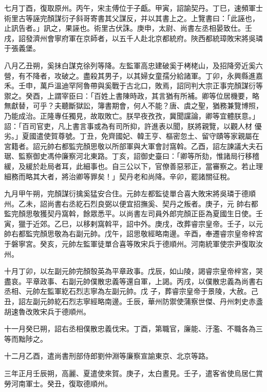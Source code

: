 \begin{pinyinscope}
 七月丁酉，復取原州。丙午，宋主傅位于子甗。甲寅，詔諭契丹。丁巳，速頻軍士術里古等誣完顏謀衍子斜哥寄書其父謀反，并以其書上之。上覽書曰：「此誣也，止訊告者。」訊之，果誣也。術里古伏誅。庚申，太尉、尚書左丞相晏致仕。壬戌，詔發濟州會寧府軍在京師者，以五千人赴北京都統府。陜西都統璋敗宋將吳璘于張義堡。



 八月乙丑朔，奚抹白謀克徐列等降。左監軍高忠建破奚于栲栳山，及招降旁近奚六營，有不降者，攻破之。盡殺其男子，以其婦女童孺分給諸軍。丁卯，永興縣進嘉禾。壬申，萬戶溫迪罕阿魯帶與奚戰于古北口，敗焉，詔同判大宗正事完顏謀衍等禦之。癸酉，上謂宰臣曰：「百姓上書陳時政，其言猶有所補。卿等位居機要，略無獻替，可乎？夫聽斷獄訟，簿書期會，何人不能？唐、虞之聖，猶務兼覽博照，乃能成治。正隆專任獨見，故取敗亡。朕早夜孜孜，冀聞讜論，卿等宜體朕意。」詔：「百司官吏，凡上書言事或為有司所抑，許進表以聞，朕將親覽，以觀人材
 優劣。」夏國遣使賀尊號。丁丑，免齊國妃、韓王亨、樞密忽土、留守賾等家親屬在宮籍者。詔元帥右都監完顏思敬以所部軍與大軍會討窩斡。乙酉，詔左諫議大夫石琚、監察御史馮仲廉察河北東路。丁亥，詔御史臺曰：「卿等所劾，惟諸局行移稽緩，及緩於赴局者耳，此細事也。自三公以下，官僚善惡邪正，當審察之。若止理細務而略其大者，將治卿等罪矣！」契丹老和尚降。辛卯，罷諸關征稅。



 九月甲午朔，完顏謀衍擒奚猛安合住。元帥左都監徒單合喜大敗宋將吳璘于德順州。乙未，詔尚書右丞紇石烈良弼以便宜招撫奚、契丹之叛者。庚子，元
 帥右都監完顏思敬獲契丹窩斡，餘眾悉平。以尚書左司員外郎完顏正臣為夏國生日使。壬寅，獵于近郊。乙巳，以移剌窩斡平，詔中外。庚戌，改葬睿宗皇帝。壬子，以元帥右都監完顏思敬為右副元帥。戊午，詔思敬經略南邊。辛酉，奉遷睿宗皇帝梓宮于磐寧宮。癸亥，元帥左監軍徒單合喜等敗宋兵于德順州。河南統軍使宗尹復取汝州。



 十月丁卯，以左副元帥完顏彀英為平章政事。戊辰，如山陵，謁睿宗皇帝梓宮，哭盡哀。平章政事、右副元帥僕散忠義等還自軍，上謁。丙戌，以僕散忠義為尚書右丞相、元帥左監軍紇石烈志寧為左副元帥。戊
 子，葬睿宗皇帝于景陵，大赦。己丑，詔左副元帥紇石烈志寧經略南邊。壬辰，華州防禦使蒲察世傑、丹州刺史赤盞胡速魯改敗宋兵于德順州。



 十一月癸巳朔，詔右丞相僕散忠義伐宋。丁酉，第職官，廉能、汙濫、不職各為三等而黜陟之。



 十二月乙酉，遣尚書刑部侍郎劉仲淵等廉察宣諭東京、北京等路。



 三年正月壬辰朔，高麗、夏遣使來賀。庚子，太白晝見。壬子，遣客省使烏居仁賞勞河南軍士。癸丑，復取德順州。




\end{pinyinscope}

